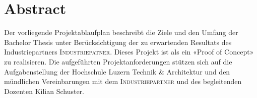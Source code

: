 \chapter*{Abstract}

Der vorliegende Projektablaufplan beschreibt die Ziele und den Umfang der Bachelor Thesis unter Berücksichtigung der zu erwartenden Resultats des Industriepartners \textsc{Industriepatner}. Dieses Projekt ist als ein «Proof of Concept» zu realisieren. Die aufgeführten Projektanforderungen stützen sich auf die Aufgabenstellung der Hochschule Luzern Technik \& Architektur und den mündlichen Vereinbarungen mit dem \textsc{Industriepartner} und des begleitenden Dozenten Kilian Schuster.